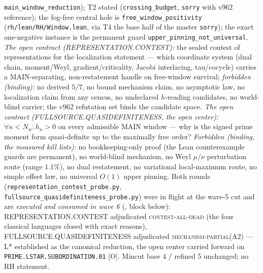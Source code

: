 {\texttt{main\_window\_reduction}); T2 stated
(\texttt{crossing\_budget}, \texttt{sorry} with v962 reference);
the fog-free central hole is \texttt{free\_window\_positivity}
(\texttt{rh/lean/RH/Window.lean}, via T4 the base half of the
master \texttt{sorry}); the exact one-negative instance is the
permanent guard \texttt{upper\_pinning\_not\_universal}.
\emph{The open contract (REPRESENTATION.CONTEST):} the sealed
contest of representations for the localization statement ---
which coordinate system (dual chain, moment/Weyl,
gradient/criticality, Jacobi interlacing, tau/cocycle) carries a
MAIN-separating, non-restatement handle on free-window survival;
\emph{forbidden (binding):} no derived $5/7$, no bound mechanism
claim, no asymptotic law, no localization claim from any census,
no undeclared $h$-reading candidates, no world-blind carrier; the
v962 refutation set binds the candidate space.  \emph{The open
contract (FULLSOURCE.QUASIDEFINITENESS, the open center):}
$\forall n < N_w : h_n > 0$ on every admissible MAIN window ---
why is the signed prime moment form quasi-definite up to the
maximally free order?  \emph{Forbidden (binding, the measured
kill lists):} no bookkeeping-only proof (the Lean counterexample
guards are permanent), no world-blind mechanism, no Weyl
$\mu/\nu$ perturbation route (range $1.1\%$), no dual
restatement, no variational local-maximum route, no simple offset
law, no universal $O(1)$ upper pinning.  Both rounds
(\texttt{representation\_contest\_probe.py},
\texttt{fullsource\_quasidefiniteness\_probe.py}) were in flight
at the wave-5 cut and are \emph{executed and consumed in wave 6}
(, block below):
REPRESENTATION.CONTEST adjudicated \textsc{contest-all-dead}
(the four classical languages closed with exact reasons),
FULLSOURCE.QUASIDEFINITENESS adjudicated
\textsc{mechanism-partial}(A2) --- L* established as the
canonical reduction, the open center carried forward on
\texttt{PRIME.LSTAR.\allowbreak SUBORDINATION.01} [O].  Mincut
base 4 / refined 5 unchanged; no RH statement.\par}



